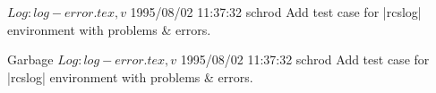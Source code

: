 \documentclass{article}
\begin{document}
\begin{rcslog}

$Log: log-error.tex,v $
 1995/08/02 11:37:32 schrod
Add test case for |rcslog| environment with problems \& errors.

\end{rcslog}

\begin{rcslog}
Garbage
$Log: log-error.tex,v $
 1995/08/02 11:37:32 schrod
Add test case for |rcslog| environment with problems \& errors.

\end{rcslog}
\end{document}
